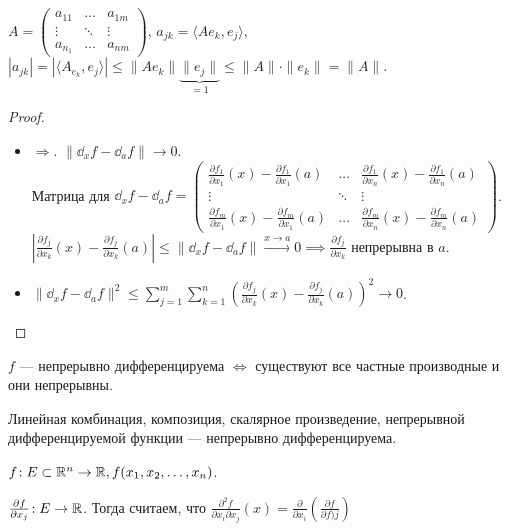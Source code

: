 \begin{remark}
    $A = \begin{pmatrix} a_{11} & \ldots & a_{1m}\\ \vdots & \ddots & \vdots \\ a_{n_1} & \ldots & a_{nm} \end{pmatrix}$, $a_{jk} = \langle Ae_k, e_j \rangle$,  $|a_{jk}| = |\langle A_{e_k}, e_j \rangle| \le \|Ae_k\| \underbrace{\|e_j\|}_{=1} \le \|A\| \cdot \|e_k\| = \|A\|$.
\end{remark}

\begin{proof}
    \begin{itemize}
        \item $\Rightarrow$. $\|\dd_xf - \dd_af\| \to 0$. \\ Матрица для  $\dd_xf - \dd_af = \begin{pmatrix} \frac{\partial f_1}{\partial x_1}(x) - \frac{\partial f_1}{\partial x_1}(a) & \ldots & \frac{\partial f_1}{\partial x_n}(x) - \frac{\partial f_1}{\partial x_n}(a) \\ \vdots & \ddots & \vdots \\ \frac{\partial f_m}{\partial x_1}(x) - \frac{\partial f_m}{\partial x_1}(a) & \ldots & \frac{\partial f_m}{\partial x_n}(x) - \frac{\partial f_m}{\partial x_n}(a) \end{pmatrix}$. $\left|\frac{\partial f_j}{\partial x_k}(x) - \frac{\partial f_j}{\partial x_k}(a)\right| \le \|\dd_xf-\dd_af\| \xrightarrow{x\to a} 0 \implies \frac{\partial f_j}{\partial x_k}$ непрерывна в $a$.
        \item $\|\dd_xf - \dd_af\|^2 \le \sum\limits_{j=1}^m \sum\limits_{k=1}^n \left( \frac{\partial f_j}{\partial x_k}(x) - \frac{\partial f_j}{\partial x_k}(a) \right)^2 \to 0$. 
   \end{itemize} 
\end{proof}
\begin{consequence}
   $f$ --- непрерывно дифференцируема  $\iff$ существуют все частные производные и они непрерывны.
\end{consequence}
\begin{theorem}
    Линейная комбинация, композиция, скалярное произведение, непрерывной дифференцируемой функции --- непрерывно дифференцируема.
\end{theorem}
\begin{definition}
    $f\!: E \subset \mathbb{R}^n \to \mathbb{R}, f(x_1, x_2, \ldots, x_n)$.

    $\frac{\partial f}{\partial x_j}\!: E \to \mathbb{R}$. Тогда считаем, что $\frac{\partial^2 f}{\partial x_i \partial x_j}(x) = \frac{\partial}{\partial x_i}\left(\frac{\partial f}{\partial f)j}\right)$
\end{definition}
